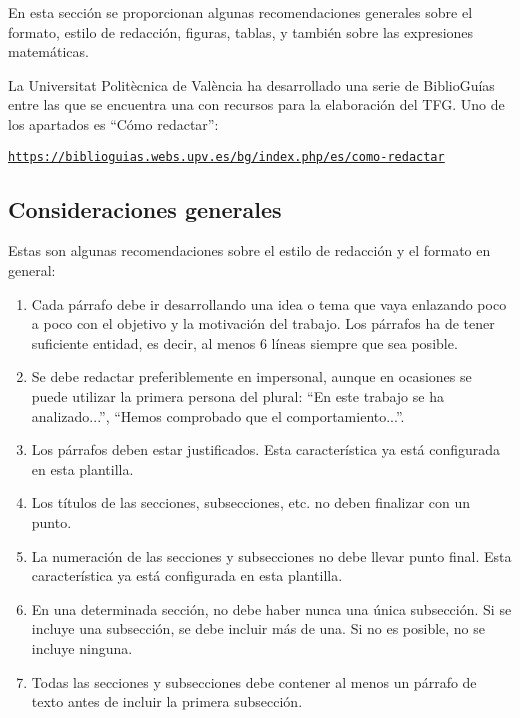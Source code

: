 \documentclass[11pt]{article}
\begin{document}
En esta sección se proporcionan algunas recomendaciones generales sobre el formato, estilo de redacción, figuras, tablas, y también sobre las expresiones matemáticas.

La Universitat Politècnica de València ha desarrollado una serie de BiblioGuías entre las que se encuentra una con recursos para la elaboración del TFG. Uno de los apartados es “Cómo redactar”:

\texttt{\url{https://biblioguias.webs.upv.es/bg/index.php/es/como-redactar}}


\subsection{Consideraciones generales}

Estas son algunas recomendaciones sobre el estilo de redacción y el formato en general:

\begin{enumerate}

    \item Cada párrafo debe ir desarrollando una idea o tema que vaya enlazando poco a poco con el objetivo y la motivación del trabajo. Los párrafos ha de tener suficiente entidad, es decir, al menos 6 líneas siempre que sea posible.
    
    \item Se debe redactar preferiblemente en impersonal, aunque en ocasiones se puede utilizar la primera persona del plural: ``En este trabajo se ha analizado...'', ``Hemos comprobado que el comportamiento...''.

    \item Los párrafos deben estar justificados. Esta característica ya está configurada en esta plantilla.

    \item Los títulos de las secciones, subsecciones, etc. no deben finalizar con un punto. 

    \item La numeración de las secciones y subsecciones no debe llevar punto final. Esta característica ya está configurada en esta plantilla.

    \item En una determinada sección, no debe haber nunca una única subsección. Si se incluye una subsección, se debe incluir más de una. Si no es posible, no se incluye ninguna.

    \item Todas las secciones y subsecciones debe contener al menos un párrafo de texto antes de incluir la primera subsección.

\end{enumerate}
\end{document}
